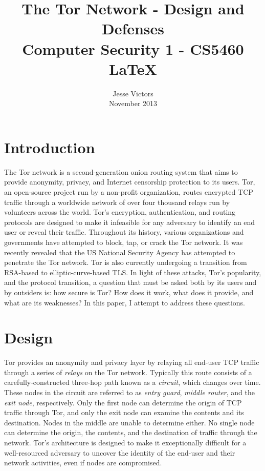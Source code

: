 \documentclass[journal]{IEEEtran}
\begin{document}
\title{The Tor Network - Design and Defenses \\ \Large Computer Security 1 - CS5460 \\ \LaTeX{}}
\author{Jesse Victors \\ November 2013}

\maketitle

\section{Introduction}

The Tor network is a second-generation onion routing system that aims to provide anonymity, privacy, and Internet censorship protection to its users. Tor, an open-source project run by a non-profit organization, routes encrypted TCP traffic through a worldwide network of over four thousand relays run by volunteers across the world. Tor's encryption, authentication, and routing protocols are designed to make it infeasible for any adversary to identify an end user or reveal their traffic. Throughout its history, various organizations and governments have attempted to block, tap, or crack the Tor network. It was recently revealed that the US National Security Agency has attempted to penetrate the Tor network. Tor is also currently undergoing a transition from RSA-based to elliptic-curve-based TLS. In light of these attacks, Tor's popularity, and the protocol transition, a question that must be asked both by its users and by outsiders is: how secure is Tor? How does it work, what does it provide, and what are its weaknesses? In this paper, I attempt to address these questions.

\section{Design}

Tor provides an anonymity and privacy layer by relaying all end-user TCP traffic through a series of \textit{relays} on the Tor network. Typically this route consists of a carefully-constructed three-hop path known as a \textit{circuit}, which changes over time. These nodes in the circuit are referred to as \textit{entry guard}, \textit{middle router}, and the \textit{exit node}, respectively. Only the first node can determine the origin of TCP traffic through Tor, and only the exit node can examine the contents and its destination. Nodes in the middle are unable to determine either. No single node can determine the origin, the contents, and the destination of traffic through the network. Tor's architecture is designed to make it exceptionally difficult for a well-resourced adversary to uncover the identity of the end-user and their network activities, even if nodes are compromised.\cite{McCoy2008}
\end{document}
